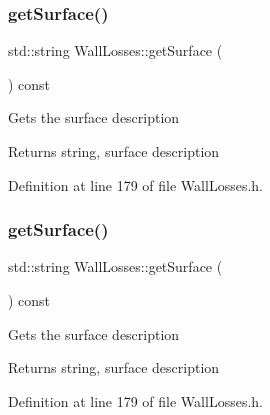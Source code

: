 \mbox{\label{class_wall_losses_a10f5de20dc6fead726adbf62a9c49b09}} 
\subsubsection{\texorpdfstring{get\+Surface()}{getSurface()}\hspace{0.1cm}{\footnotesize\ttfamily [1/3]}}
{\footnotesize\ttfamily std\+::string Wall\+Losses\+::get\+Surface (\begin{DoxyParamCaption}{ }\end{DoxyParamCaption}) const\hspace{0.3cm}{\ttfamily [inline]}}

Gets the surface description \begin{DoxyReturn}{Returns}
string, surface description 
\end{DoxyReturn}


Definition at line 179 of file Wall\+Losses.\+h.

\mbox{\label{class_wall_losses_a10f5de20dc6fead726adbf62a9c49b09}} 
\subsubsection{\texorpdfstring{get\+Surface()}{getSurface()}\hspace{0.1cm}{\footnotesize\ttfamily [2/3]}}
{\footnotesize\ttfamily std\+::string Wall\+Losses\+::get\+Surface (\begin{DoxyParamCaption}{ }\end{DoxyParamCaption}) const\hspace{0.3cm}{\ttfamily [inline]}}

Gets the surface description \begin{DoxyReturn}{Returns}
string, surface description 
\end{DoxyReturn}


Definition at line 179 of file Wall\+Losses.\+h.

\mbox{\label{class_wall_losses_a10f5de20dc6fead726adbf62a9c49b09}} 
